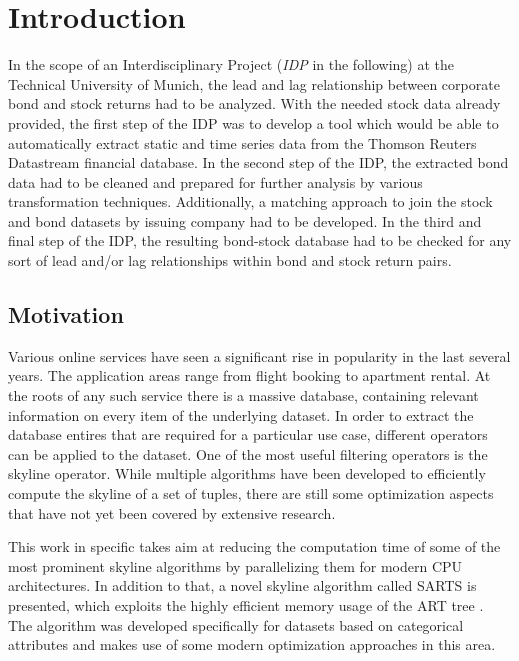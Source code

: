 \chapter{Introduction} \label{chapter:Introduction}
In the scope of an Interdisciplinary Project (\textit{IDP} in the following) at the Technical University of Munich, the lead and lag relationship between corporate bond and stock returns had to be analyzed. With the needed stock data already provided, the first step of the IDP was to develop a tool which would be able to automatically extract static and time series data from the Thomson Reuters Datastream financial database. In the second step of the IDP, the extracted bond data had to be cleaned and prepared for further analysis by various transformation techniques. Additionally, a matching approach to join the stock and bond datasets by issuing company had to be developed. In the third and final step of the IDP, the resulting bond-stock database had to be checked for any sort of lead and/or lag relationships within bond and stock return pairs. 
 
\section{Motivation}
Various online services have seen a significant rise in popularity in the last several years. The application areas range from flight booking to apartment rental. At the roots of any such service there is a massive database, containing relevant information on every item of the underlying dataset. In order to extract the database entires that are required for a particular use case, different operators can be applied to the dataset. One of the most useful filtering operators is the skyline operator. While multiple algorithms have been developed to efficiently compute the skyline of a set of tuples, there are still some optimization aspects that have not yet been covered by extensive research. 

This work in specific takes aim at reducing the computation time of some of the most prominent skyline algorithms by parallelizing them for modern CPU architectures. In addition to that, a novel skyline algorithm called SARTS is presented, which exploits the highly efficient memory usage of the ART tree \cite{art}. The algorithm was developed specifically for datasets based on categorical attributes and makes use of some modern optimization approaches in this area. 

